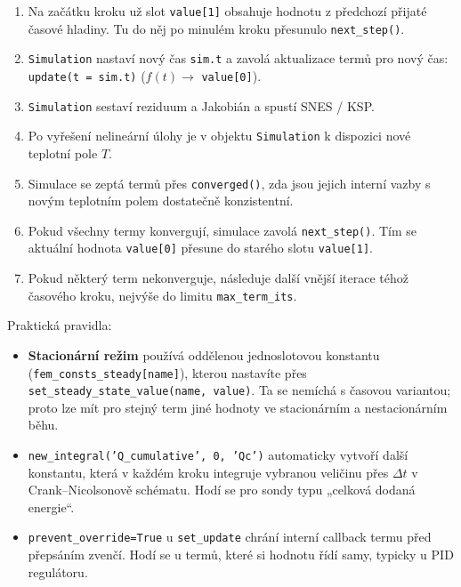 \documentclass[a4paper,11pt]{article}
\begin{document}
\begin{enumerate}[leftmargin=*]
  \item Na začátku kroku už slot \texttt{value[1]} obsahuje hodnotu z předchozí
        přijaté časové hladiny. Tu do něj po minulém kroku přesunulo
        \texttt{next\_step()}.
  \item \texttt{Simulation} nastaví nový čas \texttt{sim.t} a zavolá aktualizace
        termů pro nový čas:
        \texttt{update(t = sim.t)} \quad ($f(t) \to$ \texttt{value[0]}).
  \item \texttt{Simulation} sestaví reziduum a Jakobián a spustí SNES / KSP.
  \item Po vyřešení nelineární úlohy je v objektu \texttt{Simulation} k dispozici
        nové teplotní pole \(T\).
  \item Simulace se zeptá termů přes \texttt{converged()}, zda jsou jejich
        interní vazby s novým teplotním polem dostatečně konzistentní.
  \item Pokud všechny termy konvergují, simulace zavolá \texttt{next\_step()}.
        Tím se aktuální hodnota \texttt{value[0]} přesune do starého slotu
        \texttt{value[1]}.
  \item Pokud některý term nekonverguje, následuje další vnější iterace téhož
        časového kroku, nejvýše do limitu \texttt{max\_term\_its}.
\end{enumerate}

Praktická pravidla:

\begin{itemize}
  \item \textbf{Stacionární režim} používá oddělenou jednoslotovou konstantu
        (\texttt{fem\_consts\_steady[name]}), kterou nastavíte přes
        \texttt{set\_steady\_state\_value(name, value)}. Ta se nemíchá
        s časovou variantou; proto lze mít pro stejný term jiné hodnoty ve
        stacionárním a nestacionárním běhu.
  \item \texttt{new\_integral('Q\_cumulative', 0, 'Qc')} automaticky vytvoří
        další konstantu, která v každém kroku integruje vybranou veličinu přes
        \(\Delta t\) v Crank--Nicolsonově schématu. Hodí se pro sondy typu
        „celková dodaná energie“.
  \item \texttt{prevent\_override=True} u \texttt{set\_update} chrání interní
        callback termu před přepsáním zvenčí. Hodí se u termů, které si hodnotu
        řídí samy, typicky u PID regulátoru.
\end{itemize}
\end{document}
